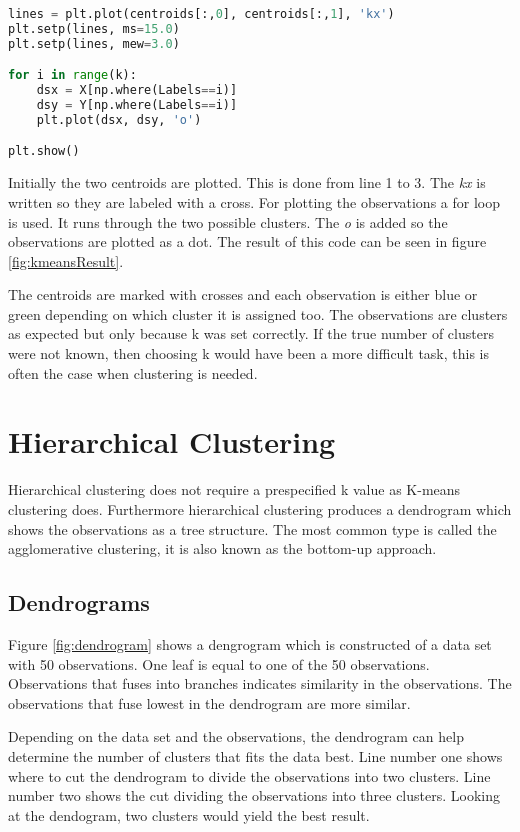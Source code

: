 \begin{lstlisting}[language=Python, label=lst:kmeansplot, caption=The code for plotting the two clusters]
lines = plt.plot(centroids[:,0], centroids[:,1], 'kx')
plt.setp(lines, ms=15.0)
plt.setp(lines, mew=3.0)

for i in range(k):
	dsx = X[np.where(Labels==i)]
	dsy = Y[np.where(Labels==i)]
	plt.plot(dsx, dsy, 'o')

plt.show()
\end{lstlisting}

Initially the two centroids are plotted. This is done from line 1 to 3. The \emph{kx} is written so they are labeled with a cross. For plotting the observations a for loop is used. It runs through the two possible clusters. The \emph{o} is added so the observations are plotted as a dot. 
The result of this code can be seen in figure \ref{fig:kmeansResult}.


The centroids are marked with crosses and each observation is either blue or green depending on which cluster it is assigned too. The observations are clusters as expected but only because k was set correctly. If the true number of clusters were not known, then choosing k would have been a more difficult task, this is often the case when clustering is needed.


\section{Hierarchical Clustering}
Hierarchical clustering does not require a prespecified k value as K-means clustering does.
Furthermore hierarchical clustering produces a dendrogram which shows the observations as a tree structure.
The most common type is called the agglomerative clustering, it is also known as the bottom-up approach.

\subsection{Dendrograms}
Figure \ref{fig:dendrogram} shows a dengrogram which is constructed of a data set with 50 observations.
One leaf is equal to one of the 50 observations. Observations that fuses into branches indicates similarity in the observations. The observations that fuse lowest in the dendrogram are more similar.

Depending on the data set and the observations, the dendrogram can help determine the number of clusters that fits the data best. Line number one shows where to cut the dendrogram to divide the observations into two clusters. Line number two shows the cut dividing the observations into three clusters. Looking at the dendogram, two clusters would yield the best result.


